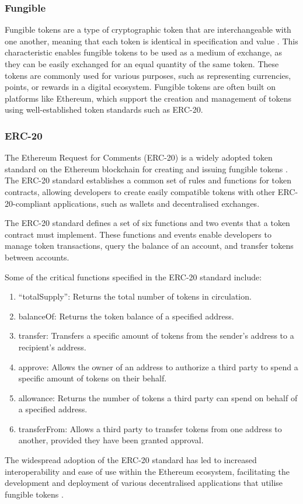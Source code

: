 \subsubsection{Fungible}
Fungible tokens are a type of cryptographic token that are interchangeable with one another, meaning that each token is identical in specification and value \cite{vogelsteller2015erc20}. This characteristic enables fungible tokens to be used as a medium of exchange, as they can be easily exchanged for an equal quantity of the same token. These tokens are commonly used for various purposes, such as representing currencies, points, or rewards in a digital ecosystem. Fungible tokens are often built on platforms like Ethereum, which support the creation and management of tokens using well-established token standards such as ERC-20.

\subsubsection{ERC-20}
The Ethereum Request for Comments (ERC-20) is a widely adopted token standard on the Ethereum blockchain for creating and issuing fungible tokens \cite{vogelsteller2015erc20}. The ERC-20 standard establishes a common set of rules and functions for token contracts, allowing developers to create easily compatible tokens with other ERC-20-compliant applications, such as wallets and decentralised exchanges.

The ERC-20 standard defines a set of six functions and two events that a token contract must implement. These functions and events enable developers to manage token transactions, query the balance of an account, and transfer tokens between accounts.

Some of the critical functions specified in the ERC-20 standard include:
\begin{enumerate}
\item	“totalSupply”: Returns the total number of tokens in circulation.
\item	balanceOf: Returns the token balance of a specified address.
\item	transfer: Transfers a specific amount of tokens from the sender's address to a recipient's address.
\item	approve: Allows the owner of an address to authorize a third party to spend a specific amount of tokens on their behalf.
\item	allowance: Returns the number of tokens a third party can spend on behalf of a specified address.
\item	transferFrom: Allows a third party to transfer tokens from one address to another, provided they have been granted approval.
\end{enumerate}
The widespread adoption of the ERC-20 standard has led to increased interoperability and ease of use within the Ethereum ecosystem, facilitating the development and deployment of various decentralised applications that utilise fungible tokens \cite{vogelsteller2015erc20}.

